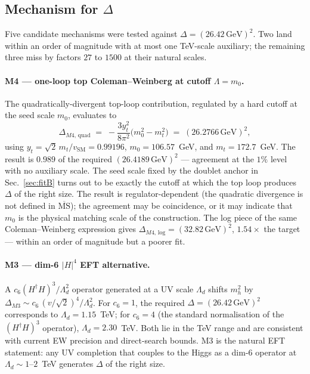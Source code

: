 \documentclass[%
 aps,
 prd,
 reprint,
 nofootinbib,
 superscriptaddress,
 amsmath,
 amssymb,
]{revtex4-2}
\begin{document}
\subsection{Mechanism for $\Delta$}\label{sec:mech}

Five candidate mechanisms were tested against $\Delta=(26.42\,\mathrm{GeV})^2$. Two land within an order of magnitude with at most one TeV-scale auxiliary; the remaining three miss by factors $27$ to $1500$ at their natural scales.

\paragraph{M4 --- one-loop top Coleman--Weinberg at cutoff $\Lambda=m_0$.} The quadratically-divergent top-loop contribution, regulated by a hard cutoff at the seed scale $m_0$, evaluates to
\begin{equation}\label{eq:M4}
\Delta_{M4,\,\mathrm{quad}} \;=\; -\frac{3y_t^2}{8\pi^2}\bigl(m_0^2 - m_t^2\bigr) \;=\; (26.2766\,\mathrm{GeV})^2,
\end{equation}
using $y_t=\sqrt{2}\,m_t/v_{\mathrm{SM}}=0.99196$, $m_0=106.57$~GeV, and $m_t=172.7$~GeV. The result is $0.989$ of the required $(26.4189\,\mathrm{GeV})^2$ --- agreement at the $1\%$ level with no auxiliary scale. The seed scale fixed by the doublet anchor in Sec.~\ref{sec:fitB} turns out to be exactly the cutoff at which the top loop produces $\Delta$ of the right size. The result is regulator-dependent (the quadratic divergence is not defined in $\overline{\mathrm{MS}}$); the agreement may be coincidence, or it may indicate that $m_0$ is the physical matching scale of the construction. The log piece of the same Coleman--Weinberg expression gives $\Delta_{M4,\,\mathrm{log}}=(32.82\,\mathrm{GeV})^2$, $1.54\times$ the target --- within an order of magnitude but a poorer fit.

\paragraph{M3 --- dim-6 $|H|^4$ EFT alternative.} A $c_6(H^\dagger H)^3/\Lambda_d^2$ operator generated at a UV scale $\Lambda_d$ shifts $m_h^2$ by $\Delta_{M3}\sim c_6\,(v/\sqrt{2})^4/\Lambda_d^2$. For $c_6=1$, the required $\Delta=(26.42\,\mathrm{GeV})^2$ corresponds to $\Lambda_d=1.15$~TeV; for $c_6=4$ (the standard normalisation of the $(H^\dagger H)^3$ operator), $\Lambda_d=2.30$~TeV. Both lie in the TeV range and are consistent with current EW precision and direct-search bounds. M3 is the natural EFT statement: any UV completion that couples to the Higgs as a dim-6 operator at $\Lambda_d\sim 1$--$2$~TeV generates $\Delta$ of the right size.
\end{document}
